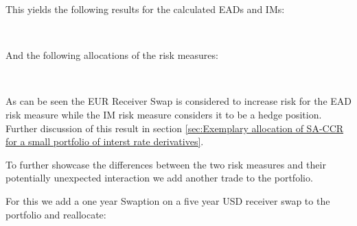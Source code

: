     This yields the following results for the calculated EADs and IMs:

            \begin{tcolorbox}[breakable, size=fbox, boxrule=.5pt, pad at break*=1mm, opacityfill=0]
    \begin{center}
        \end{center}
        { \hspace*{\fill} \\}
\end{tcolorbox}
        
    And the following allocations of the risk measures:

            \begin{tcolorbox}[breakable, size=fbox, boxrule=.5pt, pad at break*=1mm, opacityfill=0]
\begin{center}
    \end{center}
    { \hspace*{\fill} \\}
\end{tcolorbox}
        
    As can be seen the EUR Receiver Swap is considered to increase risk for
the EAD risk measure while the IM risk measure considers it to be a
hedge position. Further discussion of this result in section
\ref{sec:Exemplary allocation of SA-CCR for a small portfolio of interst rate derivatives}.

    To further showcase the differences between the two risk measures and
their potentially unexpected interaction we add another trade to the
portfolio.

For this we add a one year Swaption on a five year USD receiver swap to
the portfolio and reallocate:


